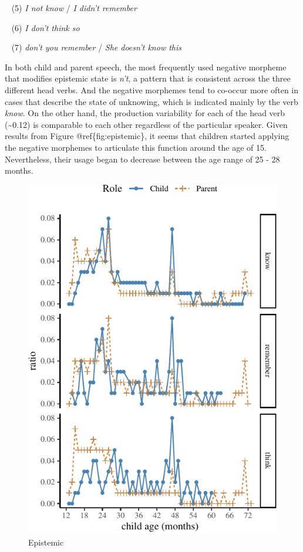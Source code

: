 \documentclass[10pt, letterpaper]{article}
\newenvironment{CodeChunk}{}{}
\begin{document}
~ (5) \emph{I not know} / \emph{I didn't remember}

~ (6) \emph{I don't think so}

~ (7) \emph{don't you remember} / \emph{She doesn't know this}

In both child and parent speech, the most frequently used negative
morpheme that modifies epistemic state is \emph{n't}, a pattern that is
consistent across the three different head verbs. And the negative
morphemes tend to co-occur more often in cases that describe the state
of unknowing, which is indicated mainly by the verb \emph{know}. On the
other hand, the production variability for each of the head verb
(\textasciitilde0.12) is comparable to each other regardless of the
particular speaker. Given results from Figure @ref\{fig:epistemic\}, it
seems that children started applying the negative morphemes to
articulate this function around the age of 15. Nevertheless, their usage
began to decrease between the age range of 25 - 28 months.

\begin{CodeChunk}
\begin{figure}[H]

{\centering \includegraphics{figs/epistemic-1} 

}

\caption[Epistemic]{Epistemic}\label{fig:epistemic}
\end{figure}
\end{CodeChunk}
\end{document}
